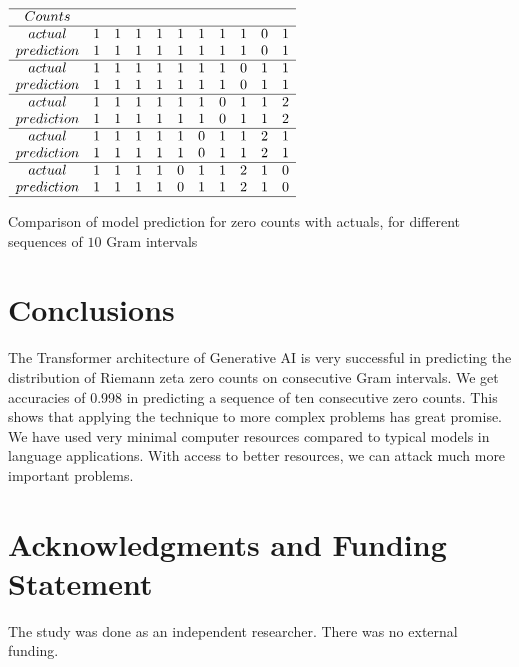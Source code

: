 \documentclass[twoside]{article}
\begin{document}
\begin{table}
\centering \(\begin{array}{ccccccccccc}
\hline
Counts& \\
\hline
actual     &1&1&1&1&1&1&1&1&0&1\\
prediction &1&1&1&1&1&1&1&1&0&1\\
\hline
actual     &1&1&1&1&1&1&1&0&1&1\\
prediction &1&1&1&1&1&1&1&0&1&1\\
\hline
actual     &1&1&1&1&1&1&0&1&1&2\\
prediction &1&1&1&1&1&1&0&1&1&2\\
\hline
actual     &1&1&1&1&1&0&1&1&2&1\\
prediction &1&1&1&1&1&0&1&1&2&1\\
\hline
actual     &1&1&1&1&0&1&1&2&1&0\\
prediction &1&1&1&1&0&1&1&2&1&0\\
\hline
\end{array}\)
\caption{Comparison of model prediction for zero counts with actuals, for different sequences of $10$ Gram intervals} 
\label{tab:perf}
\end{table}

\section{\label{conclusions}Conclusions}
The Transformer architecture of Generative AI is very successful in predicting the distribution of Riemann zeta zero counts on consecutive Gram intervals. We get accuracies of 0.998
in predicting a sequence of ten consecutive zero counts. This shows that applying the technique to more complex problems has great promise. We have used very minimal computer resources compared to typical models in language applications. With access to better resources, we can attack much more important problems.

\section*{Acknowledgments and Funding Statement}

 The study was done as an independent researcher. There was no
external funding.
\end{document}
